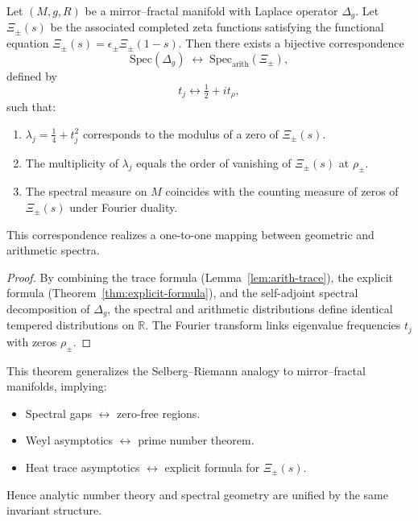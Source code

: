 \begin{theorem}
\label{thm:universal-spectral}
Let $(M,g,R)$ be a mirror–fractal manifold with Laplace operator $\Delta_g$.  
Let $\Xi_\pm(s)$ be the associated completed zeta functions satisfying the functional equation $\Xi_\pm(s)=\epsilon_\pm\Xi_\pm(1-s)$.  
Then there exists a bijective correspondence
\[
\mathrm{Spec}(\Delta_g)
\;\longleftrightarrow\;
\mathrm{Spec}_{\mathrm{arith}}(\Xi_\pm),
\]
defined by
\[
t_j \leftrightarrow \tfrac{1}{2}+i t_\rho,
\]
such that:
\begin{enumerate}[label=\arabic*.,leftmargin=*,itemsep=3pt]
  \item $\lambda_j=\tfrac{1}{4}+t_j^2$ corresponds to the modulus of a zero of $\Xi_\pm(s)$.
  \item The multiplicity of $\lambda_j$ equals the order of vanishing of $\Xi_\pm(s)$ at $\rho_\pm$.
  \item The spectral measure on $M$ coincides with the counting measure of zeros of $\Xi_\pm(s)$ under Fourier duality.
\end{enumerate}
This correspondence realizes a one-to-one mapping between geometric and arithmetic spectra. %
\end{theorem}

\begin{proof}
By combining the trace formula (Lemma~\ref{lem:arith-trace}), the explicit formula (Theorem~\ref{thm:explicit-formula}), and the self-adjoint spectral decomposition of $\Delta_g$, the spectral and arithmetic distributions define identical tempered distributions on $\mathbb{R}$.  
The Fourier transform links eigenvalue frequencies $t_j$ with zeros $\rho_\pm$. %
\end{proof}

\begin{remark}[Consequences]
\label{rem:universal-consequences}
This theorem generalizes the Selberg–Riemann analogy to mirror–fractal manifolds, implying:
\begin{itemize}[leftmargin=*,itemsep=2pt]
  \item Spectral gaps $\leftrightarrow$ zero-free regions.  
  \item Weyl asymptotics $\leftrightarrow$ prime number theorem.  
  \item Heat trace asymptotics $\leftrightarrow$ explicit formula for $\Xi_\pm(s)$.  
\end{itemize}
Hence analytic number theory and spectral geometry are unified by the same invariant structure. %
\end{remark}

